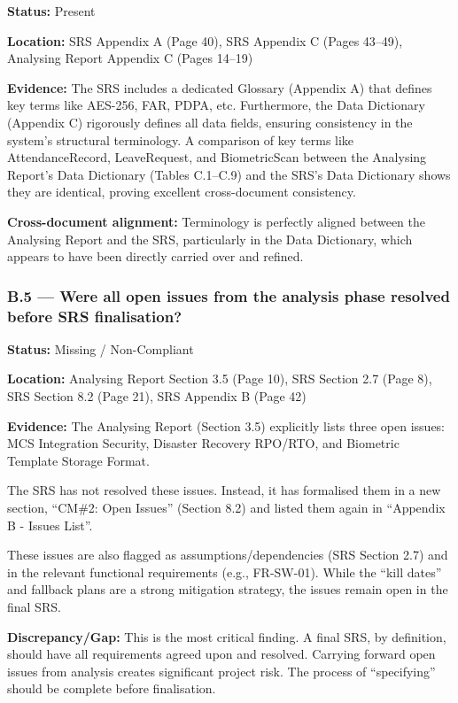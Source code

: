 \documentclass[11pt,a4paper]{article}
\begin{document}
\textbf{Status:} Present

\textbf{Location:} SRS Appendix A (Page 40), SRS Appendix C (Pages 43--49), Analysing Report Appendix C (Pages 14--19)

\textbf{Evidence:} The SRS includes a dedicated Glossary (Appendix A) that defines key terms like AES-256, FAR, PDPA, etc. Furthermore, the Data Dictionary (Appendix C) rigorously defines all data fields, ensuring consistency in the system's structural terminology. A comparison of key terms like AttendanceRecord, LeaveRequest, and BiometricScan between the Analysing Report's Data Dictionary (Tables C.1--C.9) and the SRS's Data Dictionary shows they are identical, proving excellent cross-document consistency.

\textbf{Cross-document alignment:} Terminology is perfectly aligned between the Analysing Report and the SRS, particularly in the Data Dictionary, which appears to have been directly carried over and refined.

\subsubsection*{B.5 --- Were all open issues from the analysis phase resolved before SRS finalisation?}

\textbf{Status:} Missing / Non-Compliant

\textbf{Location:} Analysing Report Section 3.5 (Page 10), SRS Section 2.7 (Page 8), SRS Section 8.2 (Page 21), SRS Appendix B (Page 42)

\textbf{Evidence:} The Analysing Report (Section 3.5) explicitly lists three open issues: MCS Integration Security, Disaster Recovery RPO/RTO, and Biometric Template Storage Format.

The SRS has not resolved these issues. Instead, it has formalised them in a new section, ``CM\#2: Open Issues'' (Section 8.2) and listed them again in ``Appendix B - Issues List''.

These issues are also flagged as assumptions/dependencies (SRS Section 2.7) and in the relevant functional requirements (e.g., FR-SW-01). While the ``kill dates'' and fallback plans are a strong mitigation strategy, the issues remain open in the final SRS.

\textbf{Discrepancy/Gap:} This is the most critical finding. A final SRS, by definition, should have all requirements agreed upon and resolved. Carrying forward open issues from analysis creates significant project risk. The process of ``specifying'' should be complete before finalisation.
\end{document}
